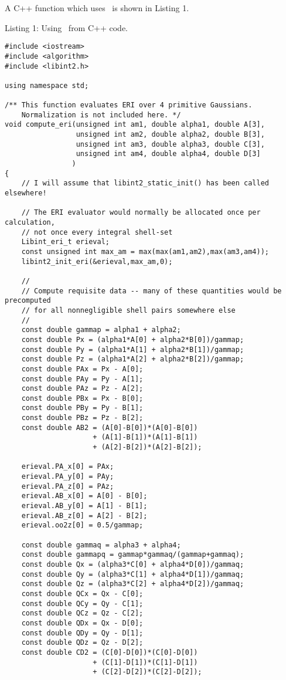 \documentclass[12pt]{article}
\begin{document}
A C++ function which uses \LIBINT\ is shown in Listing 1.

\begin{footnotesize}
Listing 1: Using \LIBINT\ from C++ code.
\begin{verbatim}
#include <iostream>
#include <algorithm>
#include <libint2.h>

using namespace std;

/** This function evaluates ERI over 4 primitive Gaussians.
    Normalization is not included here. */
void compute_eri(unsigned int am1, double alpha1, double A[3],
                 unsigned int am2, double alpha2, double B[3],
                 unsigned int am3, double alpha3, double C[3],
                 unsigned int am4, double alpha4, double D[3]
                )
{
    // I will assume that libint2_static_init() has been called elsewhere!

    // The ERI evaluator would normally be allocated once per calculation,
    // not once every integral shell-set
    Libint_eri_t erieval;
    const unsigned int max_am = max(max(am1,am2),max(am3,am4));
    libint2_init_eri(&erieval,max_am,0);

    //
    // Compute requisite data -- many of these quantities would be precomputed
    // for all nonnegligible shell pairs somewhere else
    //
    const double gammap = alpha1 + alpha2;
    const double Px = (alpha1*A[0] + alpha2*B[0])/gammap;
    const double Py = (alpha1*A[1] + alpha2*B[1])/gammap;
    const double Pz = (alpha1*A[2] + alpha2*B[2])/gammap;
    const double PAx = Px - A[0];
    const double PAy = Py - A[1];
    const double PAz = Pz - A[2];
    const double PBx = Px - B[0];
    const double PBy = Py - B[1];
    const double PBz = Pz - B[2];
    const double AB2 = (A[0]-B[0])*(A[0]-B[0])
                     + (A[1]-B[1])*(A[1]-B[1])
                     + (A[2]-B[2])*(A[2]-B[2]);
    
    erieval.PA_x[0] = PAx;
    erieval.PA_y[0] = PAy;
    erieval.PA_z[0] = PAz;
    erieval.AB_x[0] = A[0] - B[0];
    erieval.AB_y[0] = A[1] - B[1];
    erieval.AB_z[0] = A[2] - B[2];
    erieval.oo2z[0] = 0.5/gammap;
    
    const double gammaq = alpha3 + alpha4;
    const double gammapq = gammap*gammaq/(gammap+gammaq);
    const double Qx = (alpha3*C[0] + alpha4*D[0])/gammaq;
    const double Qy = (alpha3*C[1] + alpha4*D[1])/gammaq;
    const double Qz = (alpha3*C[2] + alpha4*D[2])/gammaq;
    const double QCx = Qx - C[0];
    const double QCy = Qy - C[1];
    const double QCz = Qz - C[2];
    const double QDx = Qx - D[0];
    const double QDy = Qy - D[1];
    const double QDz = Qz - D[2];
    const double CD2 = (C[0]-D[0])*(C[0]-D[0])
                     + (C[1]-D[1])*(C[1]-D[1])
                     + (C[2]-D[2])*(C[2]-D[2]);
    

\end{verbatim}
\end{footnotesize}
\end{document}

